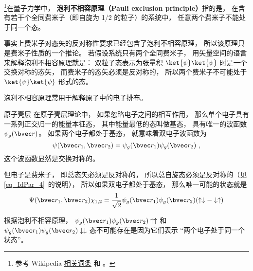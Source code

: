 
\begin{issues}
\issueDraft
\end{issues}

\footnote{参考 Wikipedia \href{https://en.wikipedia.org/wiki/Pauli_exclusion_principle}{相关词条} 和 \cite{GriffQ}。}在量子力学中， \textbf{泡利不相容原理（Pauli exclusion principle）}指的是， 在含有若干个全同费米子（即自旋为 1/2 的粒子）的系统中， 任意两个费米子不能处于同一个态。

事实上费米子对态矢的反对称性要求已经包含了泡利不相容原理， 所以该原理只是费米子性质的一个推论。 若假设系统只有两个全同费米子， 用矢量空间的语言来解释泡利不相容原理就是： 双粒子态表示为张量积 $\ket{\psi}\ket{\psi}$ 时是一个交换对称的态矢， 而费米子的态矢必须是反对称的， 所以两个费米子不可能处于 $\ket{\psi}\ket{\psi}$ 形式的态。

泡利不相容原理常用于解释原子中的电子排布。

\begin{example}{原子壳层}
在原子壳层理论中， 如果忽略电子之间的相互作用， 那么单个电子具有一系列正交归一的能量本征态， 其中能量最低的态叫做基态， 具有唯一的波函数 $\psi_g(\bvec r)$。 如果两个电子都处于基态， 就意味着双电子波函数为
\begin{equation}
\psi(\bvec r_1, \bvec r_2) = \psi_g(\bvec r_1)\psi_g(\bvec r_2)~,
\end{equation}
这个波函数显然是交换对称的。

但电子是费米子， 即总态矢必须是反对称的， 所以总自旋态必须是反对称的（见\autoref{eq_IdPar_4}~的说明）， 所以如果双电子都处于基态， 那么唯一可能的状态就是
\begin{equation}
\Psi(\bvec r_1, \bvec r_2) \chi_{1,2} = \frac{1}{\sqrt{2}}\psi_g(\bvec r_1)\psi_g(\bvec r_2)(\uparrow\downarrow - \downarrow\uparrow)
\end{equation}

根据泡利不相容原理， $\psi_g(\bvec r_1)\psi_g(\bvec r_2)\uparrow\uparrow$ 和 $\psi_g(\bvec r_1)\psi_g(\bvec r_2)\downarrow\downarrow$ 态不可能存在是因为它们表示 “两个电子处于同一个状态”。
\end{example}
